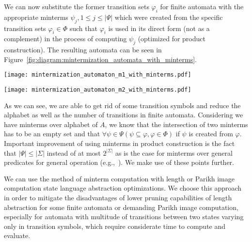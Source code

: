 We can now substitute the former transition sets $\varphi_i$ for finite automata with the appropriate minterms $\psi_j, 1 \leq j \leq |\Psi|$ which were created from the specific transition sets $\varphi_i \in \Phi$ such that $\varphi_i$ is used in its direct form (not as a complement) in the process of computing $\psi_j$ (optimized for product construction). The resulting automata can be seen in Figure~\ref{fig:diagram:mintermization_automata_with_minterms}.

\begin{figure*}[ht]
    \centering
    \begin{minipage}{0.47\linewidth}
        \centering
        \texttt{[image: mintermization\_automaton\_m1\_with\_minterms.pdf]}
        \caption{Finite automaton $A_1$ with transitions substituted by corresponding minterms $\psi_i \in \Psi$ created from these transition sets.}
        \label{fig:diagram:mintermization_automaton_m1_with_minterms}
    \end{minipage}
    \hfill
    \begin{minipage}{0.47\linewidth}
        \centering
        \texttt{[image: mintermization\_automaton\_m2\_with\_minterms.pdf]}
        \caption{Finite automaton $A_2$ with transitions substituted by corresponding minterms $\psi_i \in \Psi$ created from these transition sets.}
        \label{fig:diagram:mintermization_automaton_m2_with_minterms}
    \end{minipage}
    \vspace{0.5cm}
    \caption{Finite automata $A_1$ and $A_2$ with substituted transitions with minterms in the process of mintermization.}
    \label{fig:diagram:mintermization_automata_with_minterms}
\end{figure*}

As we can see, we are able to get rid of some transition symbols and reduce the alphabet as well as the number of transitions in finite automata. Considering we have minterms over alphabet of $A$, we know that the intersection of two minterms has to be an empty set and that $\forall \psi \in \Psi ( \psi \subseteq \varphi, \varphi \in \Phi )$ if $\psi$ is created from $\varphi$. Important improvement of using minterms in product construction is the fact that $|\Psi| \leq |\Sigma|$ instead of at most $2^{|\Sigma|}$ as is the case for minterms over general predicates for general operation (e.g.,~\cite{minterms_forms-FITPUB11801}). We make use of these points further.

We can use the method of minterm computation with length or Parikh image computation state language abstraction optimizations. We choose this approach in order to mitigate the disadvantages of lower pruning capabilities of length abstraction for some finite automata or demanding Parikh image computation, especially for automata with multitude of transitions between two states varying only in transition symbols, which require considerate time to compute and evaluate.

